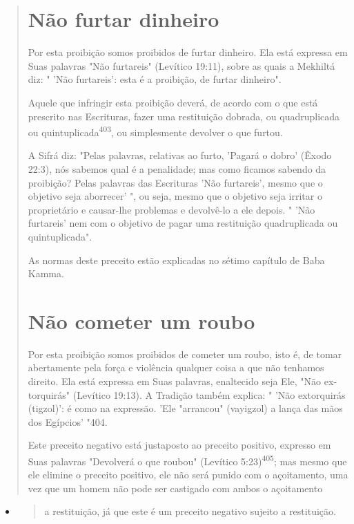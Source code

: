 \begin{quote}

\section{Não furtar dinheiro}

Por esta proibição somos proibidos de furtar dinheiro. Ela está
ex­pressa em Suas palavras "Não furtareis" (Levítico 19:11), sobre as
quais a Mek­hiltá diz: " 'Não furtareis': esta é a proibição, de furtar
dinheiro".

Aquele que infringir esta proibição deverá, de acordo com o que es­tá
prescrito nas Escrituras, fazer uma restituição dobrada, ou
quadruplicada ou quintuplicada\textsuperscript{403}, ou simplesmente
devolver o que furtou.

A Sifrá diz: "Pelas palavras, relativas ao furto, 'Pagará o dobro'
(Êxo­do 22:3), nós sabemos qual é a penalidade; mas como ficamos sabendo
da proi­bição? Pelas palavras das Escrituras 'Não furtareis', mesmo que
o objetivo seja aborrecer' ", ou seja, mesmo que o objetivo seja irritar
o proprietário e causar-lhe problemas e devolvê-lo a ele depois. " 'Não
furtareis' nem com o objetivo de pagar uma restituição quadruplicada ou
quintuplicada".

As normas deste preceito estão explicadas no sétimo capítulo de Ba­ba
Kamma.

\section{Não cometer um roubo}

Por esta proibição somos proibidos de cometer um roubo, isto é, de tomar
abertamente pela força e violência qualquer coisa a que não tenha­mos
direito. Ela está expressa em Suas palavras, enaltecido seja Ele, "Não
ex­torquirás" (Levítico 19:13). A Tradição também explica: " 'Não
extorquirás (tig­zol)': é como na expressão. 'Ele "arrancou" (vayigzol)
a lança das mãos dos Egípcios' "404.

Este preceito negativo está justaposto ao preceito positivo, expres­so
em Suas palavras "Devolverá o que roubou" (Levítico
5:23)\textsuperscript{405}; mas mes­mo que ele elimine o preceito
positivo, ele não será punido com o açoitamen­to, uma vez que um homem
não pode ser castigado com ambos o açoitamento
\end{quote}

\begin{itemize}
\item
 \begin{quote}
 a restituição, já que este é um preceito negativo sujeito a
 restituição.
 \end{quote}
\end{itemize}

